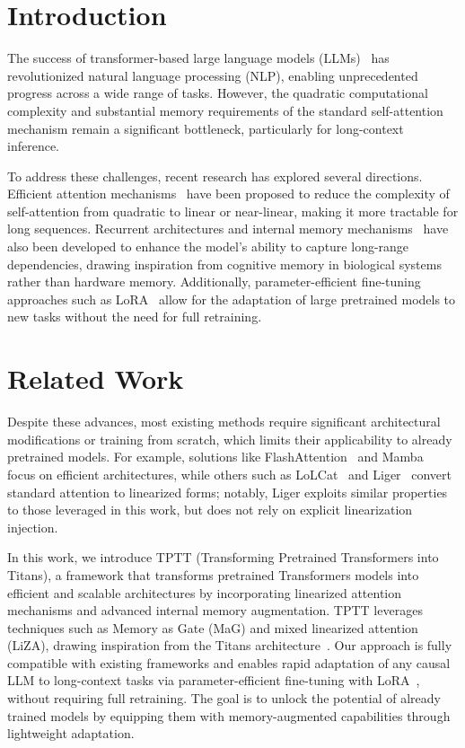 \documentclass[10pt,a4paper]{article}
\begin{document}
\section{Introduction}

The success of transformer-based large language models (LLMs)~\cite{vaswani2017attention, mann2020language} has revolutionized natural language processing (NLP), enabling unprecedented progress across a wide range of tasks. However, the quadratic computational complexity and substantial memory requirements of the standard self-attention mechanism remain a significant bottleneck, particularly for long-context inference. 

To address these challenges, recent research has explored several directions. Efficient attention mechanisms~\cite{katharopoulos2020transformers, yang2024parallelizing} have been proposed to reduce the complexity of self-attention from quadratic to linear or near-linear, making it more tractable for long sequences. Recurrent architectures and internal memory mechanisms~\cite{mercat2024linearizing, behrouz2024titans} have also been developed to enhance the model's ability to capture long-range dependencies, drawing inspiration from cognitive memory in biological systems rather than hardware memory. Additionally, parameter-efficient fine-tuning approaches such as LoRA~\cite{hu2022lora} allow for the adaptation of large pretrained models to new tasks without the need for full retraining.

\section{Related Work}

Despite these advances, most existing methods require significant architectural modifications or training from scratch, which limits their applicability to already pretrained models. For example, solutions like FlashAttention~\cite{dao2023flashattention} and Mamba~\cite{gu2023mamba} focus on efficient architectures, while others such as LoLCat~\cite{zhang2024lolcats} and Liger~\cite{lan2025liger} convert standard attention to linearized forms; notably, Liger exploits similar properties to those leveraged in this work, but does not rely on explicit linearization injection.

In this work, we introduce TPTT (Transforming Pretrained Transformers into Titans), a framework that transforms pretrained Transformers models into efficient and scalable architectures by incorporating linearized attention mechanisms and advanced internal memory augmentation. TPTT leverages techniques such as Memory as Gate (MaG) and mixed linearized attention (LiZA), drawing inspiration from the Titans architecture~\cite{behrouz2024titans}. Our approach is fully compatible with existing frameworks and enables rapid adaptation of any causal LLM to long-context tasks via parameter-efficient fine-tuning with LoRA~\cite{hu2022lora}, without requiring full retraining. The goal is to unlock the potential of already trained models by equipping them with memory-augmented capabilities through lightweight adaptation.
\end{document}
